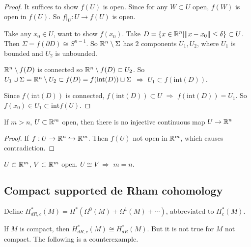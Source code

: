 \begin{proof}
    It suffices to show  $ f(U)  $ is open. Since for any  $ W\subset U  $ open,  $ f(W)  $ is open in  $ f(U) $. So  $ f|_U:U\rightarrow f(U)  $ is open.

    Take any  $ x_0\in U  $, want to show  $ f(x_0) $. Take  $ D=\{x\in \mathbb R^n|\|x-x_0\| \leq \delta\}\subset U $. Then  $ \Sigma =f(\partial D)\cong S^{n-1} $. So  $ \mathbb R^n\setminus \Sigma $  has  $ 2  $ components  $ U_1,U_2 $, where  $ U_1 $ is bounded and  $ U_2 $ is unbounded. 
    
     $ \mathbb R^n\setminus f(D)  $ is connected so  $ \mathbb R^n\setminus f(D)\subset U_2 $. So  $ U_1\cup \Sigma=\mathbb R^n \setminus U_2\subset f(D)=f(\mathrm{int}(D))\sqcup \Sigma $ $ \Rightarrow  $  $ U_1\subset f(\mathrm{int}(D)) $.
     
     Since  $ f(\mathrm{int}(D)) $ is connected,  $ f(\mathrm{int}(D))\subset U $ $ \Rightarrow  $ $ f(\mathrm{int}(D))=U_1 $. So  $ f(x_0)\in U_1\subset \mathrm{int}f(U) $.     
\end{proof}
\begin{corollary}
    If  $ m>n  $,  $ U\subset \mathbb R^m  $ open, then there is no injective continuous map  $ U\rightarrow \mathbb R^n $ 
\end{corollary}
\begin{proof}
    If $ f:U\rightarrow \mathbb R^n\hookrightarrow \mathbb R^m $. Then  $ f(U)  $  not open in  $ \mathbb R^m $, which causes contradiction. 
\end{proof}
\begin{corollary}
    $ U\subset \mathbb R^m $,  $ V\subset \mathbb R^m $ open.  $ U\cong V $ $ \Rightarrow  $ $ m=n $.     
\end{corollary}

\subsection{Compact supported de Rham cohomology}
Define  $ H_{dR,c}^*(M)=H^*(\Omega^0(M)+\Omega^1(M)+\cdots) $, abbreviated to  $ H_c^*(M) $.

If  $ M  $ is compact, then  $ H_{dR,c}^*(M)\cong H_{dR}^*(M) $. But it is not true for  $ M  $ not compact. The following is a counterexample.

